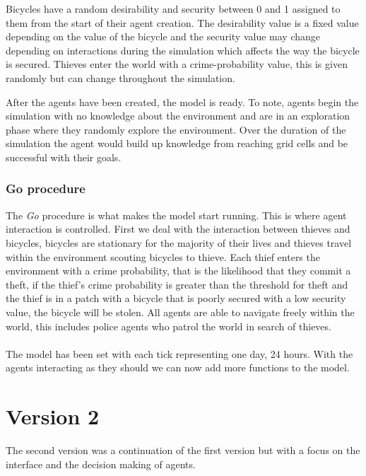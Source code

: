\documentclass[11pt]{informatics-report}
\begin{document}
Bicycles have a random desirability and security between 0 and 1 assigned to them from the start of their agent creation. The desirability value is a fixed value depending on the value of the bicycle and the security value may change depending on interactions during the simulation which affects the way the bicycle is secured. Thieves enter the world with a crime-probability value, this is given randomly but can change throughout the simulation. 

After the agents have been created, the model is ready. To note, agents begin the simulation with no knowledge about the environment and are in an exploration phase where they randomly explore the environment. Over the duration of the simulation the agent would build up knowledge from reaching grid cells and be successful with their goals.  

\subsubsection{Go procedure}
The \textit{Go} procedure is what makes the model start running. This is where agent interaction is controlled. First we deal with the interaction between thieves and bicycles, bicycles are stationary for the majority of their lives and thieves travel within the environment scouting bicycles to thieve. Each thief enters the environment with a crime probability, that is the likelihood that they commit a theft, if the thief's crime probability is greater than the threshold for theft and the thief is in a patch with a bicycle that is poorly secured with a low security value, the bicycle will be stolen. All agents are able to navigate freely within the world, this includes police agents who patrol the world in search of thieves.\par

\paragraph{}
The model has been set with each tick representing one day, 24 hours. With the agents interacting as they should we can now add more functions to the model.


\section{Version 2}
The second version was a continuation of the first version but with a focus on the interface and the decision making of agents. \par
\end{document}
